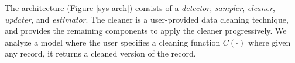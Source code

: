 



The \sys architecture (Figure \ref{sys-arch}) consists of a \emph{detector}, \emph{sampler}, \emph{cleaner}, \emph{updater}, and \emph{estimator}.
The cleaner is a user-provided data cleaning technique, and \sys provides the remaining components to apply the cleaner progressively.
We analyze a model where the user specifies a cleaning function $C(\cdot)$ where given any record, it returns a cleaned version of the record.

